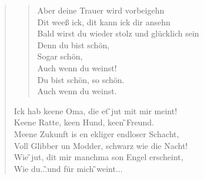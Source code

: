\documentclass[9pt,a4paper,oneside, onecolumn]{article}
\begin{document}
\begin{small}
\begin{verse}
\begin{verse}
Aber deine Trauer wird vorbeigehn\\
Dit weeß ick, dit kann ick dir ansehn\\
Bald wirst du wieder stolz und glücklich sein\\
Denn du bist schön,\\
Sogar schön,\\
Auch wenn du weinst!\\
Du bist schön, so schön.\\
Auch wenn du weinst.\\
\end{verse}

Ick \D{}hab keene Oma, die et \G{}jut mit mir meint!\\
Keene \D{}Ratte, keen Hund, keen \G{}Freund.\\
Meene \HH{}Zukunft is en \Hs{}ekliger \Em{}endloser Schacht,\\
Voll \C{}Glibber un Modder, \D{}schwarz wie die Nacht!\\

Wie \G{}jut, dit mir manchma son \C{}Engel erscheint,\\
Wie \D{}du...\qquad\C{}\qquad\G{}\qquad\D{}\qquad{}und für mich \G{}weint...\\
\end{verse}
\end{small}
\end{document}
